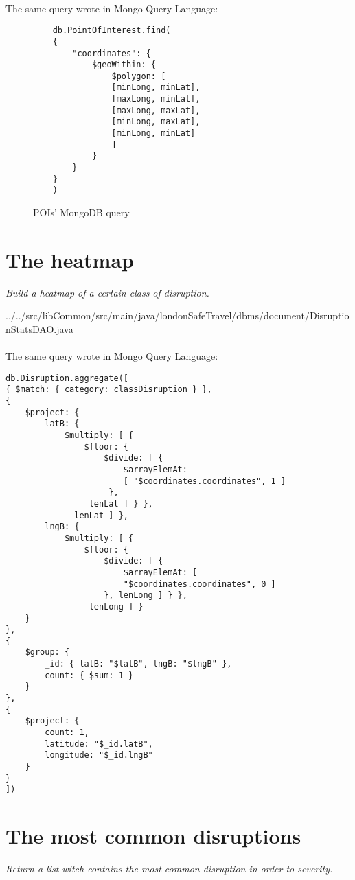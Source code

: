 \paragraph{}
The same query wrote in Mongo Query Language:
\begin{figure}[H]
\begin{lstlisting}
	db.PointOfInterest.find(
	{
		"coordinates": {
			$geoWithin: {
				$polygon: [
				[minLong, minLat],
				[maxLong, minLat],
				[maxLong, maxLat],
				[minLong, maxLat],
				[minLong, minLat]
				]
			}
		}
	}
	)
\end{lstlisting}
\caption{POIs' MongoDB query}
\end{figure}

\section{The heatmap}
\textit{Build a heatmap of a certain class of disruption.}


{../../src/libCommon/src/main/java/londonSafeTravel/dbms/document/DisruptionStatsDAO.java}

\paragraph{}
The same query wrote in Mongo Query Language:

\begin{lstlisting}
db.Disruption.aggregate([
{ $match: { category: classDisruption } },
{ 
	$project: {
		latB: { 
			$multiply: [ { 
				$floor: { 
					$divide: [ { 
						$arrayElemAt: 
						[ "$coordinates.coordinates", 1 ]
					 }, 
				 lenLat ] } },
			  lenLat ] },
		lngB: { 
			$multiply: [ { 
				$floor: { 
					$divide: [ { 
						$arrayElemAt: [ 
						"$coordinates.coordinates", 0 ] 
					}, lenLong ] } },
				 lenLong ] }
	}
},
{ 
	$group: {
		_id: { latB: "$latB", lngB: "$lngB" },
		count: { $sum: 1 }
	}
},
{
	$project: {
		count: 1,
		latitude: "$_id.latB",
		longitude: "$_id.lngB"
	}
}
])
\end{lstlisting}

\section{The most common disruptions}
\textit{Return a list witch contains the most common disruption in order to severity.}

